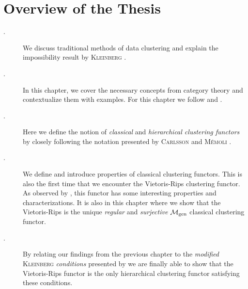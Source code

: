 \section*{Overview of the Thesis}
\begin{description}

    \item[.] We discuss traditional methods of data clustering and explain the impossibility result by \textsc{Kleinberg} \cite{Kleinberg2002}.

    \item[.] In this chapter, we cover the necessary concepts from category theory and contextualize them with examples. For this chapter we follow \cite{Roman2017} and \cite{Leinster2014-dc}.

    \item[.] Here we define the notion of \emph{classical} and \emph{hierarchical clustering functors} by closely following the notation presented by \textsc{Carlsson} and \textsc{M\'emoli} \cite{Carlsson2010}.

    \item[.] We define and introduce properties of classical clustering functors. This is also the first time that we encounter the Vietoris-Rips clustering functor. As observed by \cite{JMLR:v11:carlsson10a}, \cite{Carlsson2010} this functor has some interesting properties and characterizations. It is also in this chapter where we show that the Vietoris-Rips is the unique \emph{regular} and \emph{surjective} ${\mathcal{M}_\mathrm{gen}}$ classical clustering functor.

    \item[.] By relating our findings from the previous chapter to the \emph{modified} \textsc{Kleinberg} \emph{conditions} presented by \cite[Sec.~7.3.1]{Carlsson2010} we are finally able to show that the Vietoris-Rips functor is the only hierarchical clustering functor satisfying these conditions.
\end{description}

